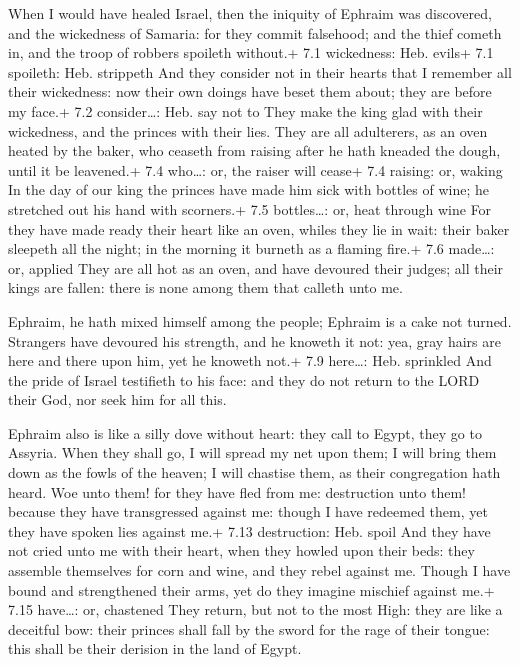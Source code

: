  When I would have healed Israel, then the iniquity of
Ephraim was discovered, and the wickedness of Samaria: for they commit
falsehood; and the thief cometh in, and the troop of robbers spoileth
without.+ 7.1 wickedness: Heb. evils+ 7.1 spoileth: Heb. strippeth
 And they consider not in their hearts that I remember all
their wickedness: now their own doings have beset them about; they are
before my face.+ 7.2 consider\ldots: Heb. say not to  They
make the king glad with their wickedness, and the princes with their
lies.  They are all adulterers, as an oven heated by the
baker, who ceaseth from raising after he hath kneaded the dough, until
it be leavened.+ 7.4 who\ldots: or, the raiser will cease+ 7.4 raising:
or, waking  In the day of our king the princes have made him
sick with bottles of wine; he stretched out his hand with scorners.+ 7.5
bottles\ldots: or, heat through wine  For they have made
ready their heart like an oven, whiles they lie in wait: their baker
sleepeth all the night; in the morning it burneth as a flaming fire.+
7.6 made\ldots: or, applied  They are all hot as an oven,
and have devoured their judges; all their kings are fallen: there is
none among them that calleth unto me.

 Ephraim, he hath mixed himself among the people; Ephraim is
a cake not turned.  Strangers have devoured his strength,
and he knoweth it not: yea, gray hairs are here and there upon him, yet
he knoweth not.+ 7.9 here\ldots: Heb. sprinkled  And the
pride of Israel testifieth to his face: and they do not return to the
LORD their God, nor seek him for all this.

 Ephraim also is like a silly dove without heart: they
call to Egypt, they go to Assyria.  When they shall go, I
will spread my net upon them; I will bring them down as the fowls of the
heaven; I will chastise them, as their congregation hath heard.
 Woe unto them! for they have fled from me: destruction
unto them! because they have transgressed against me: though I have
redeemed them, yet they have spoken lies against me.+ 7.13 destruction:
Heb. spoil  And they have not cried unto me with their
heart, when they howled upon their beds: they assemble themselves for
corn and wine, and they rebel against me.  Though I have
bound and strengthened their arms, yet do they imagine mischief against
me.+ 7.15 have\ldots: or, chastened  They return, but not
to the most High: they are like a deceitful bow: their princes shall
fall by the sword for the rage of their tongue: this shall be their
derision in the land of Egypt.

